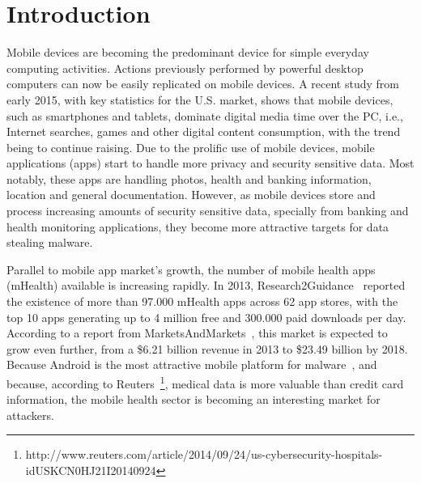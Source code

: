
% 
% 
\section{Introduction}



Mobile devices are becoming the predominant device for simple everyday computing activities. Actions previously performed by powerful desktop computers can now be easily replicated on mobile devices. A recent study \cite{comscore} from early 2015, with key statistics for the U.S. market, shows that mobile devices, such as smartphones and tablets, dominate digital media time over the \ac{PC}, i.e., Internet searches, games and other digital content consumption, with the trend being to continue raising. Due to the prolific use of mobile devices, mobile applications (apps) start to handle more privacy and security sensitive data. Most notably, these apps are handling photos, health and banking information, location and general documentation. However, as mobile devices store and process increasing amounts of security sensitive data, specially from banking and health monitoring applications, they become more attractive targets for data stealing malware.

Parallel to mobile app market's growth, the number of mobile health apps (mHealth) available is increasing rapidly. In 2013, Research2Guidance~\cite{research2guidance} reported the existence of more than 97.000 mHealth apps across 62 app stores, with the top 10 apps generating up to 4 million free and 300.000 paid downloads per day. According to a report from MarketsAndMarkets~\cite{marketsandmarkets}, this market is expected to grow even further, from a \$6.21 billion revenue in 2013 to \$23.49 billion by 2018. Because Android is the most attractive mobile platform for malware~\cite{fsecure}, and because, according to Reuters~\footnote{http://www.reuters.com/article/2014/09/24/us-cybersecurity-hospitals-idUSKCN0HJ21I20140924}, medical data is more valuable than credit card information, the mobile health sector is becoming an interesting market for attackers.


